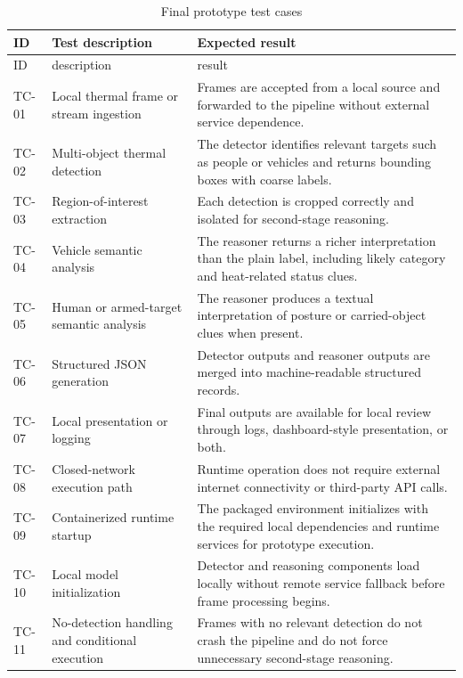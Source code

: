 \setlength{\LTleft}{0pt}
\setlength{\LTright}{0pt}
\begin{longtable}{@{}>{\ttfamily\small}p{1.5cm}p{5.4cm}p{7.2cm}}
  \caption{Final prototype test cases}\\
  \toprule
  ID & Test description & Expected result \\
  \midrule
  \endfirsthead

  \toprule
  ID & description & result \\
  \midrule
  \endhead

  TC-01 & Local thermal frame or stream ingestion & Frames are accepted from a local
  source and forwarded to the pipeline without external service dependence. \\
  TC-02 & Multi-object thermal detection & The detector identifies relevant targets such as
  people or vehicles and returns bounding boxes with coarse labels. \\
  TC-03 & Region-of-interest extraction & Each detection is cropped correctly and isolated
  for second-stage reasoning. \\
  TC-04 & Vehicle semantic analysis & The reasoner returns a richer interpretation than the
  plain label, including likely category and heat-related status clues. \\
  TC-05 & Human or armed-target semantic analysis & The reasoner produces a textual
  interpretation of posture or carried-object clues when present. \\
  TC-06 & Structured JSON generation & Detector outputs and reasoner outputs are merged
  into machine-readable structured records. \\
  TC-07 & Local presentation or logging & Final outputs are available for local review
  through logs, dashboard-style presentation, or both. \\
  TC-08 & Closed-network execution path & Runtime operation does not require external
  internet connectivity or third-party API calls. \\
  TC-09 & Containerized runtime startup & The packaged environment initializes with the
  required local dependencies and runtime services for prototype execution. \\
  TC-10 & Local model initialization & Detector and reasoning components load locally
  without remote service fallback before frame processing begins. \\
  TC-11 & No-detection handling and conditional execution & Frames with no relevant
  detection do not crash the pipeline and do not force unnecessary second-stage reasoning. \\
  \bottomrule
\end{longtable}

